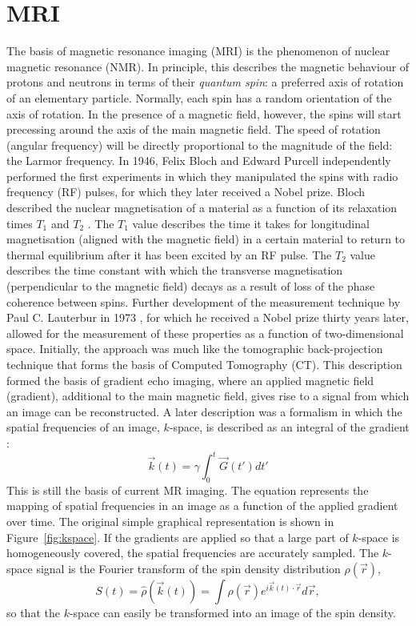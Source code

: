 \section*{MRI}
The basis of magnetic resonance imaging (MRI) is the phenomenon of nuclear magnetic resonance (NMR). In principle, this describes the magnetic behaviour of protons and neutrons in terms of their \emph{quantum spin}: a preferred axis of rotation of an elementary particle. Normally, each spin has a random orientation of the axis of rotation. In the presence of a magnetic field, however, the spins will start precessing around the axis of the main magnetic field. The speed of rotation (angular frequency) will be directly proportional to the magnitude of the field: the Larmor frequency. In 1946, Felix Bloch and Edward Purcell independently performed the first experiments in which they manipulated the spins with radio frequency (RF) pulses, for which they later received a Nobel prize. Bloch described the nuclear magnetisation of a material as a function of its relaxation times $T_1$ and $T_2$ \cite{Bloch1946}. The $T_1$ value describes the time it takes for longitudinal magnetisation (aligned with the magnetic field) in a certain material to return to thermal equilibrium after it has been excited by an RF pulse. The $T_2$ value describes the time constant with which the transverse magnetisation (perpendicular to the magnetic field) decays as a result of loss of the phase coherence between spins. Further development of the measurement technique by Paul C. Lauterbur in 1973 \cite{Lauterbur1973}, for which he received a Nobel prize thirty years later, allowed for the measurement of these properties as a function of two-dimensional space. Initially, the approach was much like the tomographic back-projection technique that forms the basis of Computed Tomography (CT). This description formed the basis of gradient echo imaging, where an applied magnetic field (gradient), additional to the main magnetic field, gives rise to a signal from which an image can be reconstructed. A later description was a formalism in which the spatial frequencies of an image, $k$-space, is described as an integral of the gradient \cite{Twieg1983,Ljunggren1983}:
\begin{equation}
\vec{k}(t)=\gamma \int_{0}^{t}\vec{G}(t')dt'
\end{equation}
This is still the basis of current MR imaging. The equation represents the mapping of spatial frequencies in an image as a function of the applied gradient over time. The original simple graphical representation is shown in Figure~\ref{fig:kspace}. If the gradients are applied so that a large part of $k$-space is homogeneously covered, the spatial frequencies are accurately sampled. The $k$-space signal is the Fourier transform of the spin density distribution $\rho (\vec{r})$,
\begin{equation}
S(t)=\hat{\rho}(\vec{k}(t))=\int\rho(\vec{r})e^{i \vec{k}(t) \cdot \vec{r}}d\vec{r},
\end{equation}
so that the $k$-space can easily be transformed into an image of the spin density.


